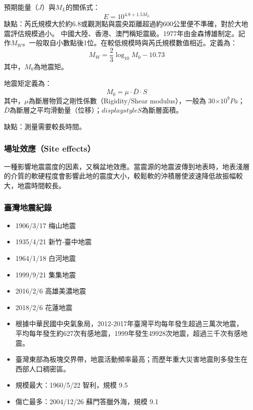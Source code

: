 \documentclass[a4paper,12pt]{report}
\begin{document}
預期能量（$J$）與$M_L$的關係式：
$$\displaystyle E=10^{4.8+1.5M_L}$$
缺點：芮氏規模大於約6.8或觀測點與震央距離超過約600公里便不準確，對於大地震評估規模過小。
中國大陸、香港、澳門稱矩震級。1977年由金森博雄制定。記作$M_W$。一般取自小數點後1位。在較低規模時與芮氏規模數值相近。定義為：
$$\displaystyle M_{W}=\frac{2}{3}\log_{10}M_{0}-10.73$$
其中，$\displaystyle M_{0}$為地震矩。

地震矩定義為：
$$\displaystyle M_{0}=\mu \cdot \bar {D}\cdot S$$
其中，$\displaystyle \mu $為斷層物質之剛性係數（Rigidity/Shear modulus），一般為 30$\times 10^9 Pa$；$\displaystyle \bar {D}$為斷層之平均滑動量（位移）；$displaystyle S$為斷層面積。

缺點：測量需要較長時間。
\subsubsection{場址效應（Site effects）}
一種影響地震震度的因素，又稱盆地效應。當震源的地震波傳到地表時，地表淺層的介質的軟硬程度會影響此地的震度大小，較鬆軟的沖積層使波速降低故振幅較大，地震時間較長。
\subsubsection{臺灣地震紀錄}
\begin{itemize}
\item 1906/3/17 梅山地震
\item 1935/4/21 新竹-臺中地震
\item 1964/1/18 白河地震
\item 1999/9/21 集集地震
\item 2016/2/6 高雄美濃地震
\item 2018/2/6 花蓮地震
\item 根據中華民國中央氣象局，2012-2017年臺灣平均每年發生超過三萬次地震，平均每年發生約627次有感地震，1999年發生49928次地震，超過三千次有感地震。
\item 臺灣東部為板塊交界帶，地震活動頻率最高；而歷年重大災害地震則多發生在西部人口稠密區。
\end{itemize}
\begin{itemize}
\item 規模最大：1960/5/22 智利，規模 9.5
\item 傷亡最多：2004/12/26 蘇門答臘外海，規模 9.1
\end{itemize}
\end{document}
